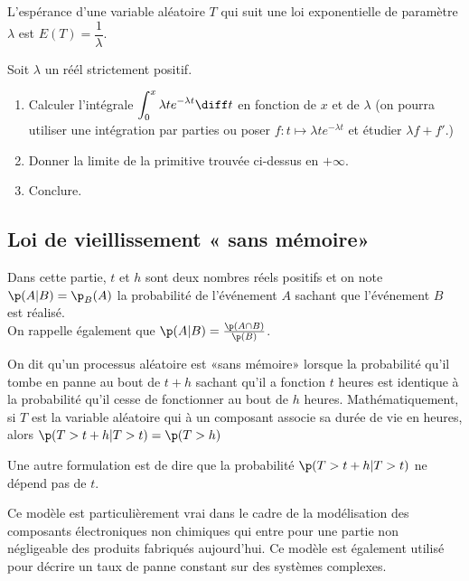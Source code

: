 \documentclass[12pt,a4paper,french]{article}
\begin{document}
\begin{proposition}
  L'espérance d'une variable aléatoire $T$ qui suit une loi
  exponentielle de paramètre $\lambda$ est $E(T) = \dfrac1{\lambda}$.
\end{proposition}

\begin{question}
  Soit $\lambda$ un réél strictement positif.
  \begin{enumerate}
    \item Calculer l'intégrale $\displaystyle\int_0^x \lambda te^{-\lambda t} \diff
      t$ en fonction de $x$ et de $\lambda$ (on pourra utiliser une
        intégration par parties ou poser $f:t\mapsto \lambda
        te^{-\lambda t}$ et étudier $\lambda f + f'$.)
    \item Donner la limite de la primitive trouvée ci-dessus en
      $+\infty$.
    \item Conclure.
  \end{enumerate}
\end{question}

\subsection{Loi de vieillissement « sans mémoire»}

Dans cette partie, $t$ et $h$ sont deux nombres réels positifs et on
note $\p(A | B) = \p_B(A)$ la probabilité de l'événement $A$ sachant que
l'événement $B$ est réalisé.\\
On rappelle également que $\p(A | B) = \frac{\p(A\cap B)}{\p(B)}$.

\begin{definition}
  On dit qu'un processus aléatoire est «sans mémoire» lorsque la
  probabilité qu'il tombe en panne au bout de $t+h$ sachant qu'il a
  fonction $t$ heures est identique à la probabilité qu'il cesse de
  fonctionner au bout de $h$ heures. Mathématiquement, si $T$ est la
  variable aléatoire qui à un composant associe sa durée de vie en
  heures, alors $\p(T > t+h | T > t) = \p(T > h)$
\end{definition}

Une autre formulation est de dire que la probabilité $\p(T > t+h | T >
t)$ ne dépend pas de $t$.

Ce modèle est particulièrement vrai dans le cadre de la modélisation des
composants électroniques non chimiques qui entre pour une partie non
négligeable des produits fabriqués aujourd'hui. Ce modèle est également
utilisé pour décrire un taux de panne constant sur des systèmes
complexes.
\end{document}

